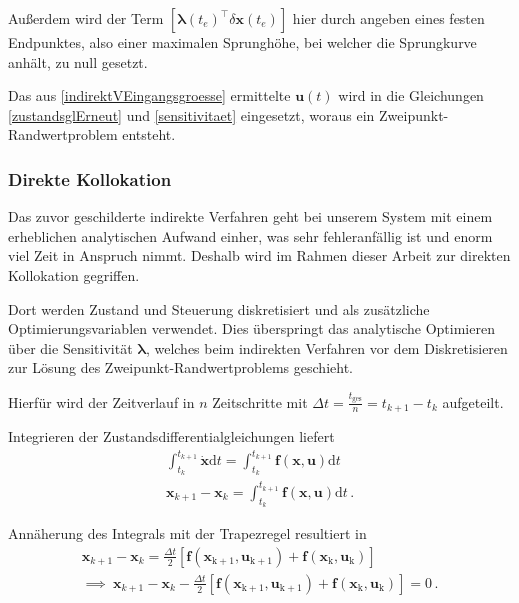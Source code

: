\documentclass[]{scrartcl}
\begin{document}
Außerdem wird der Term $\left[ \boldsymbol{\lambda}(t_e)^{\top} \delta\mathbf{x}(t_e) \right]$ hier durch angeben eines festen Endpunktes, also einer maximalen Sprunghöhe, bei welcher die Sprungkurve anhält, zu null gesetzt.

Das aus \eqref{indirektVEingangsgroesse} ermittelte $\mathbf{u}(t)$ wird in die Gleichungen \eqref{zustandsglErneut} und \eqref{sensitivitaet} eingesetzt, woraus ein Zweipunkt-Randwertproblem entsteht.

\subsubsection{Direkte Kollokation}
Das zuvor geschilderte indirekte Verfahren geht bei unserem System mit einem erheblichen analytischen Aufwand einher, was sehr fehleranfällig ist und enorm viel Zeit in Anspruch nimmt. Deshalb wird im Rahmen dieser Arbeit zur direkten Kollokation gegriffen.

Dort werden Zustand und Steuerung diskretisiert und als zusätzliche Optimierungsvariablen verwendet. Dies überspringt das analytische Optimieren über die Sensitivität $\boldsymbol{\lambda}$, welches beim indirekten Verfahren vor dem Diskretisieren zur Lösung des Zweipunkt-Randwertproblems geschieht.

Hierfür wird der Zeitverlauf in $n$ Zeitschritte mit $\Delta t = \frac{t_{\mathrm{ges}}}{n} = t_{k+1} - t_k$ aufgeteilt.

Integrieren der Zustandsdifferentialgleichungen liefert
\begin{align}
	\int_{t_k}^{t_{k+1}} \dot{\mathbf{x}} \mathrm{d}t = \int_{t_k}^{t_{k+1}} \mathbf{f}\left(\mathbf{x}, \mathbf{u}\right) \mathrm{d}t \\
	\mathbf{x}_{k+1} - \mathbf{x}_k = \int_{t_k}^{t_{k+1}} \mathbf{f}\left(\mathbf{x}, \mathbf{u}\right) \mathrm{d}t \, .
\end{align}

Annäherung des Integrals mit der Trapezregel resultiert in
\begin{equation}
	\begin{gathered}
		\mathbf{x}_{k+1} - \mathbf{x}_k = \frac{\Delta t}{2} \left[ \mathbf{f}\left(\mathbf{x}_{\mathrm{k+1}}, \mathbf{u}_{\mathrm{k+1}}\right) + \mathbf{f}\left(\mathbf{x}_{\mathrm{k}}, \mathbf{u}_{\mathrm{k}}\right) \right] \\
		\implies \ \mathbf{x}_{k+1} - \mathbf{x}_k - \frac{\Delta t}{2} \left[ \mathbf{f}\left(\mathbf{x}_{\mathrm{k+1}}, \mathbf{u}_{\mathrm{k+1}}\right) + \mathbf{f}\left(\mathbf{x}_{\mathrm{k}}, \mathbf{u}_{\mathrm{k}}\right) \right] = 0 \, .
	\end{gathered}
\end{equation}
\end{document}
